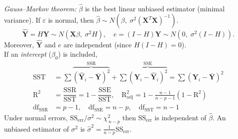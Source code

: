 \documentclass[10pt]{article}
\newcommand{\vect}[1]{\symbf{#1}} %
\begin{document}
\begin{multicols}{3}
\begin{tikzpicture}[>=stealth,scale=0.8]
  \end{tikzpicture}\\[0em]
  \textit{Gauss--Markov theorem:} \( \hat{\beta} \) is the best linear unbiased estimator (minimal variance).
  If \( \varepsilon \) is normal, then \( \hat{\beta} \sim N(\beta,\;\sigma^2(\vect{X}^T \vect{X})^{-1}). \)
  \[ \hat{\vect{Y}} = H \vect{Y} \sim N(\vect{X}\beta,\;\sigma^2 H), \quad  e = (I-H)\vect{Y} \sim N(0,\;\sigma^2 (I-H)). \]
  Moreover, \( \hat{\vect{Y}} \) and \( e \) are independent (since \( H(I-H)=0 \)).\\[0em]
  If an \textit{intercept} (\( \beta_0 \)) is included,
  \begin{align}
    \mathrm{SST}               & = \sum \overbrace{ (\hat{\vect{Y}}_i - \bar{\vect{Y}})^2}^{\mathrm{SSR}} + \sum \overbrace{(\vect{Y}_i-\hat{\vect{Y}}_i)^2}^{\mathrm{SSE}} = \sum (\vect{Y}_i - \bar{\vect{Y}})^2 \\
    \mathrm{R}^2               & = \dfrac{\mathrm{SSR}}{\mathrm{SST}} = 1 - \dfrac{\mathrm{SSE}}{\mathrm{SST}}, \quad \mathrm{R_{adj}^2} = 1 - \tfrac{n-1}{n-p-1}\left(1-\mathrm{R^2}\right)                       \\
    \mathrm{df}_{\mathrm{SSR}} & =p-1, \quad \mathrm{df}_{\mathrm{SSE}} = n - p, \quad \mathrm{df}_{\mathrm{SST}}=n-1 \tag{DoF}
  \end{align}
  Under normal errors, \( \mathrm{SS_{err}}/\sigma^2 \sim \chi^2_{\,n-p}\) then \(\mathrm{SS_{err}}\) is independent of \( \hat{\beta} \).
  An unbiased estimator of \( \sigma^2 \) is \( \hat{\sigma}^2 = \tfrac{1}{n-p}\mathrm{SS_{err}}.\)
\end{multicols}
\end{document}

